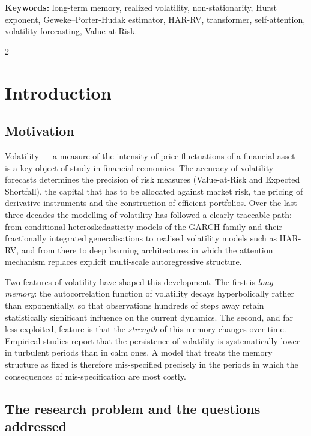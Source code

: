 \documentclass[a4paper,10pt,twoside]{article}
\begin{document}
\textbf{Keywords:} long-term memory, realized volatility, non-stationarity, Hurst exponent,
Geweke--Porter-Hudak estimator, HAR-RV, transformer, self-attention, volatility forecasting,
Value-at-Risk.

\begin{multicols}{2}


\section{Introduction}

\subsection{Motivation}

Volatility --- a measure of the intensity of price fluctuations of a financial asset --- is a key
object of study in financial economics. The accuracy of volatility forecasts determines the
precision of risk measures (Value-at-Risk and Expected Shortfall), the capital that has to be
allocated against market risk, the pricing of derivative instruments and the construction of
efficient portfolios. Over the last three decades the modelling of volatility has followed a
clearly traceable path: from conditional heteroskedasticity models of the GARCH family and their
fractionally integrated generalisations to realised volatility models such as HAR-RV, and from there
to deep learning architectures in which the attention mechanism replaces explicit multi-scale
autoregressive structure.

Two features of volatility have shaped this development. The first is \emph{long memory}: the
autocorrelation function of volatility decays hyperbolically rather than exponentially, so that
observations hundreds of steps away retain statistically significant influence on the current
dynamics. The second, and far less exploited, feature is that the \emph{strength} of this memory
changes over time. Empirical studies report that the persistence of volatility is systematically
lower in turbulent periods than in calm ones. A model that treats the memory structure as fixed is
therefore mis-specified precisely in the periods in which the consequences of mis-specification are
most costly.

\subsection{The research problem and the questions addressed}


\end{multicols}
\end{document}
